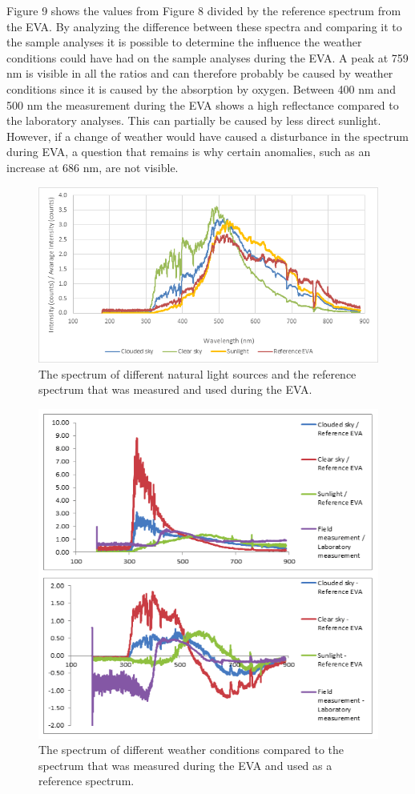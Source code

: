 \documentclass[preprint]{elsarticle}
\begin{document}
Figure 9 shows the values from Figure 8 divided by the reference spectrum from the EVA. By analyzing the difference between these spectra and comparing it to the sample analyses it is possible to determine the influence the weather conditions could have had on the sample analyses during the EVA. A peak at 759 nm is visible in all the ratios and can therefore probably be caused by weather conditions since it is caused by the absorption by oxygen. Between 400 nm and 500 nm the measurement during the EVA shows a high reflectance compared to the laboratory analyses. This can partially be caused by less direct sunlight. However, if a change of weather would have caused a disturbance in the spectrum during EVA, a question that remains is why certain anomalies, such as an increase at 686 nm, are not visible.

\begin{figure}
\centering
\includegraphics{img/figure08.png}
\caption{The spectrum of different natural light sources and the reference spectrum that was measured and used during the EVA.}
\label{fig:f08}
\end{figure}

\begin{figure}
\centering
\includegraphics{img/figure09.png}
\caption{The spectrum of different weather conditions compared to the spectrum that was measured during the EVA and used as a reference spectrum.}
\label{fig:f09}
\end{figure}
\end{document}
